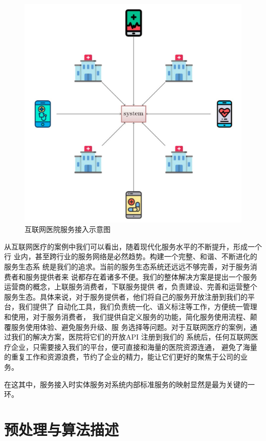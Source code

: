 \begin{figure}[htbp]
    \centering
    \includegraphics[scale=0.5]{./images/serverAdvise.jpg}
    \caption{互联网医院服务接入示意图}
    \label{fig:serverAdvise}
  \end{figure}

从互联网医疗的案例中我们可以看出，随着现代化服务水平的不断提升，形成一个行
业内，甚至跨行业的服务网络是必然趋势。构建一个完整、和谐、不断进化的服务生态系
统是我们的追求。当前的服务生态系统还远远不够完善，对于服务消费者和服务提供者来
说都存在着诸多不便。我们的整体解决方案是提出一个服务运营商的概念，上联服务消费者，下联服务提供
者，负责建设、完善和运营整个服务生态。具体来说，对于服务提供者，他们将自己的服务开放注册到我们的平台，我们提供了
自动化工具，我们负责统一化、语义标注等工作，方便统一管理和使用，对于服务消费者，
我们提供自定义服务的功能，简化服务使用流程、颠覆服务使用体验、避免服务升级、服
务选择等问题。对于互联网医疗的案例，通过我们的解决方案，医院将它们的开放API 注册到我们的
系统后，任何互联网医疗企业，只需要接入我们的平台，便可直接和海量的医院资源连通，
避免了海量的重复工作和资源浪费，节约了企业的精力，能让它们更好的聚焦于公司的业
务。

在这其中，服务接入时实体服务对系统内部标准服务的映射显然是最为关键的一环。

\section{预处理与算法描述}

